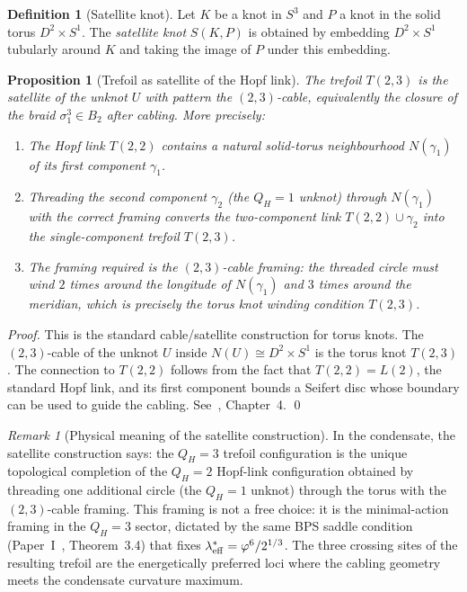 \documentclass[11pt,a4paper]{article}
\newtheorem{proposition}[theorem]{Proposition}
\theoremstyle{definition}\newtheorem{definition}[theorem]{Definition}
\theoremstyle{remark}
\newtheorem{remark}[theorem]{Remark}
\newcommand{\vp}{\varphi}
\newcommand{\QH}{Q_H}
\begin{document}
\begin{definition}[Satellite knot]
\label{P18:def:satellite}
Let $K$ be a knot in $S^3$ and $P$ a knot in the solid torus
$D^2\times S^1$.  The \emph{satellite knot} $S(K,P)$ is obtained
by embedding $D^2\times S^1$ tubularly around $K$ and taking the
image of $P$ under this embedding.
\end{definition}

\begin{proposition}[Trefoil as satellite of the Hopf link]
\label{P18:prop:satellite}
The trefoil $T(2,3)$ is the satellite of the unknot $U$ with
pattern the $(2,3)$-cable, equivalently the closure of the braid
$\sigma_1^3\in B_2$ after cabling.  More precisely:
\begin{enumerate}[noitemsep,label=(\roman*)]
\item The Hopf link $T(2,2)$ contains a natural solid-torus neighbourhood
  $N(\gamma_1)$ of its first component $\gamma_1$.
\item Threading the second component $\gamma_2$ (the $\QH=1$ unknot)
  through $N(\gamma_1)$ with the correct framing converts the
  two-component link $T(2,2)\cup\gamma_2$ into the single-component
  trefoil $T(2,3)$.
\item The framing required is the $(2,3)$-cable framing: the threaded
  circle must wind $2$ times around the longitude of $N(\gamma_1)$
  and $3$ times around the meridian, which is precisely the torus knot
  winding condition $T(2,3)$.
\end{enumerate}
\end{proposition}

\begin{proof}
This is the standard cable/satellite construction for torus knots.
The $(2,3)$-cable of the unknot $U$ inside $N(U)\cong D^2\times S^1$
is the torus knot $T(2,3)$.  The connection to $T(2,2)$ follows from
the fact that $T(2,2)=L(2)$, the standard Hopf link, and its first
component bounds a Seifert disc whose boundary can be used to guide
the cabling.  See~\cite{Rolfsen1976}, Chapter~4.
\qed
\end{proof}

\begin{remark}[Physical meaning of the satellite construction]
\label{P18:rem:satellite_physical}
In the condensate, the satellite construction says: the $\QH=3$
trefoil configuration is the unique topological completion of the
$\QH=2$ Hopf-link configuration obtained by threading one additional
circle (the $\QH=1$ unknot) through the torus with the $(2,3)$-cable
framing.  This framing is not a free choice: it is the
minimal-action framing in the $\QH=3$ sector, dictated by the
same BPS saddle condition (Paper~I~\cite{Paper1}, Theorem~3.4) that
fixes $\lambda_{\rm eff}^*=\vp^6/2^{1/3}$.  The three crossing
sites of the resulting trefoil are the energetically preferred loci
where the cabling geometry meets the condensate curvature maximum.
\end{remark}
\end{document}
